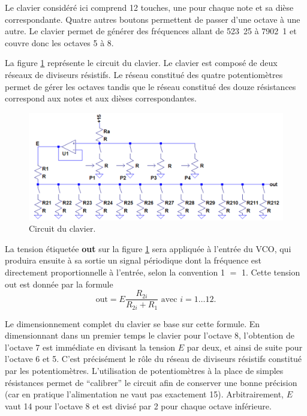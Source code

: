 
Le clavier considéré ici comprend 12 touches, une pour
chaque note et sa dièse correspondante. Quatre autres
boutons permettent de passer d'une octave à une autre.
Le clavier permet de générer des fréquences allant de
\unit{523.25}{\hertz} à \unit{7902.1}{\hertz} et couvre
donc les octaves 5 à 8.


La figure \ref{fig:keyboard-circuit} représente le
circuit du clavier. Le clavier est composé de deux
réseaux de diviseurs résistifs. Le réseau constitué
des quatre potentiomètres permet de gérer les octaves
tandis que le réseau constitué des douze résistances
correspond aux notes et aux dièses correspondantes.

\begin{figure}[ht]
	\centering
	\includegraphics[scale=0.65]{img/keyboard-circuit.png}
	\caption{Circuit du clavier.}
	\label{fig:keyboard-circuit}
\end{figure}

La tension étiquetée \textbf{out} sur la figure
\ref{fig:keyboard-circuit} sera appliquée à l'entrée
du VCO, qui produira ensuite à sa sortie un signal
périodique dont la fréquence est directement 
proportionnelle à l'entrée, selon la convention
\unit{1}{\milli\volt} $=$ \unit{1}{\hertz}. Cette
tension $\text{out}$ est donnée par la formule 
\[ \text{out} = E\frac{R_{2i}}{R_{2i} + R_1} \text{  avec  } i = 1\dots12. \]

Le dimensionnement complet du clavier se base
sur cette formule. En dimensionnant dans un premier
temps le clavier pour l'octave 8, l'obtention
de l'octave 7 est immédiate en divisant la tension
$E$ par deux, et ainsi de suite pour l'octave 6 et 5.
C'est précisément le rôle du réseau de diviseurs
résistifs constitué par les potentiomètres. L'utilisation
de potentiomètres à la place de simples résistances
permet de ``calibrer'' le circuit afin de conserver
une bonne précision (car en pratique l'alimentation
ne vaut pas exactement \unit{15}{\volt}).
Arbitrairement, $E$ vaut \unit{14}{\volt} pour l'octave
8 et est divisé par 2 pour chaque octave inférieure.

